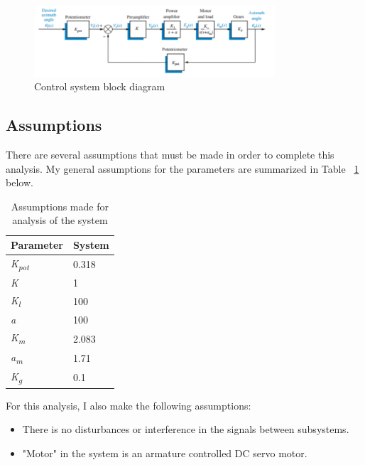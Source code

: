 \documentclass[12pt]{article}
\begin{document}
\begin{figure}[H]
\begin{center}
	\includegraphics[width=0.8\textwidth]{./img/SystemBlockDiagram.png}
	\caption{\label{fig:SysBlockDiagram}Control system block diagram}
\end{center}
\end{figure}

\subsection{Assumptions}

There are several assumptions that must be made in order to complete this analysis. My general assumptions for the parameters are summarized in Table ~\ref{tab:assumptions} below.

\begin{table}[H]
\begin{center}
\begin{tabular}{| l | l |}
	\hline
	Parameter & System \\ \hline
	\textit{K\textsubscript{pot}} & 0.318 \\ \hline
	\textit{K} & 1 \\ \hline
	\textit{K\textsubscript{l}} & 100 \\ \hline
	\textit{a} & 100 \\ \hline
	\textit{K\textsubscript{m}} & 2.083 \\ \hline
	\textit{a\textsubscript{m}} & 1.71 \\ \hline
	\textit{K\textsubscript{g}} & 0.1 \\ \hline
\end{tabular}
\caption{\label{tab:assumptions}Assumptions made for analysis of the system \cite{nise}}
\end{center}
\end{table}

For this analysis, I also make the following assumptions:
\begin{itemize}
	\item There is no disturbances or interference in the signals between subsystems.
	\item "Motor" in the system is an armature controlled DC servo motor.
\end{itemize}
\end{document}

